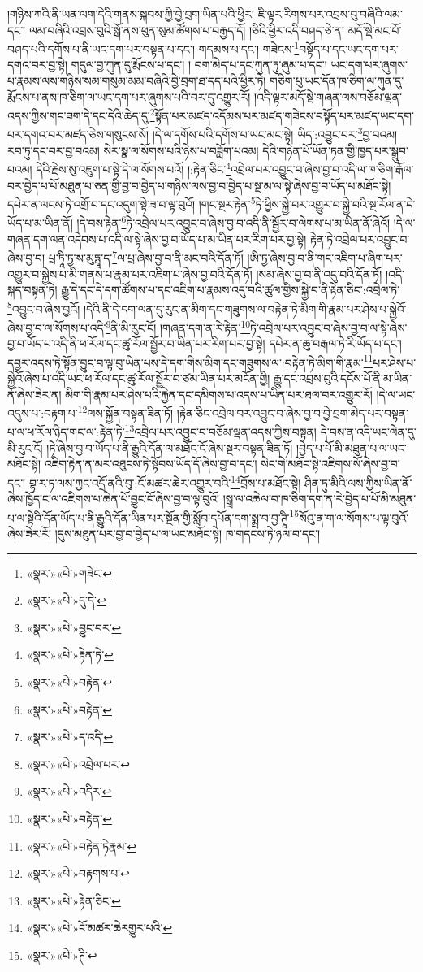 །གཉིས་ཀའི་ནི་ཡན་ལག་དེའི་གནས་སྐབས་ཀྱི་བྱེ་བྲག་ཡིན་པའི་ཕྱིར། ཇི་ལྟར་རིགས་པར་འབྲས་བུ་བཞིའི་ལམ་དང་། ལམ་བཞིའི་འབྲས་བུའི་སྒོ་ནས་ཕུན་སུམ་ཚོགས་པ་བརྒྱད་དོ། །ཅིའི་ཕྱིར་འདི་བཤད་ཅེ་ན། མདོ་སྡེ་མང་པོ་བཤད་པའི་དགོས་པ་ནི་ཡང་དག་པར་བསྟན་པ་དང་། གདམས་པ་དང་། གཟེངས་\footnote{«སྣར་»«པེ་»གཟེང་}བསྟོད་པ་དང་ཡང་དག་པར་དགའ་བར་བྱ་སྟེ། གདུལ་བྱ་ཀུན་དུ་རྨོངས་པ་དང་། །
བག་མེད་པ་དང་ཀུན་ཏུ་ཞུམ་པ་དང་། ཡང་དག་པར་ཞུགས་པ་རྣམས་ལས་གཉིས་སམ་གསུམ་མམ་བཞིའི་བྱེ་བྲག་ཐ་དད་པའི་ཕྱིར་ཏེ། གཅིག་པུ་ཡང་དོན་ཁ་ཅིག་ལ་ཀུན་དུ་རྨོངས་པ་ནས་ཁ་ཅིག་ལ་ཡང་དག་པར་ཞུགས་པའི་བར་དུ་འགྱུར་རོ། །འདི་ལྟར་མདོ་སྡེ་གཞན་ལས་བཅོམ་ལྡན་འདས་ཀྱིས་གང་ཟག་དེ་དང་དེའི་ཆེད་དུ་\footnote{«སྣར་»«པེ་»དུ་དེ་}སྟོན་པར་མཛད་འདོམས་པར་མཛད་གཟེངས་བསྟོད་པར་མཛད་ཡང་དག་པར་དགའ་བར་མཛད་ཅེས་གསུངས་སོ། །དེ་ལ་དགོས་པའི་དགོས་པ་ཡང་མང་སྟེ། ཡིད་:འབྱུང་བར་\footnote{«སྣར་»«པེ་»བྱུང་བར་}བྱ་བའམ། རབ་ཏུ་དང་བར་བྱ་བའམ། སེར་སྣ་ལ་སོགས་པའི་ཉེས་པ་བཟློག་པའམ། དེའི་གཉེན་པོ་ཡོན་ཏན་གྱི་ཁྱད་པར་སྒྲུབ་པའམ། དེའི་རྗེས་སུ་འཇུག་པ་སྟེ་དེ་ལ་སོགས་པའོ། །:རྟེན་ཅིང་\footnote{«སྣར་»«པེ་»རྟེན་ཏེ་}འབྲེལ་པར་འབྱུང་བ་ཞེས་བྱ་བ་འདི་ལ་ཁ་ཅིག་རྒོལ་བར་བྱེད་པ་པོ་མཐུན་པ་ཅན་གྱི་བྱ་བ་བྱེད་པ་གཉིས་ལས་བྱ་བ་བྱེད་པ་སྔ་མ་ལ་སྟེ་ཞེས་བྱ་བ་ཡོད་པ་མཐོང་སྟེ། དཔེར་ན་ལངས་ཏེ་འགྲོ་བ་དང་འདུག་སྟེ་ཟ་བ་ལྟ་བུའོ། །གང་སྔར་རྟེན་\footnote{«སྣར་»«པེ་»བརྟེན་}ཏེ་ཕྱིས་སྐྱེ་བར་འགྱུར་བ་སྐྱེ་བའི་སྔ་རོལ་ན་དེ་ཡོད་པ་མ་ཡིན་ནོ། །དེ་བས་རྟེན་\footnote{«སྣར་»«པེ་»བརྟེན་}ཏེ་འབྲེལ་པར་འབྱུང་བ་ཞེས་བྱ་བ་འདི་ནི་སྦྱོར་བ་ལེགས་པ་མ་ཡིན་ནོ་ཞེའོ། །དེ་ལ་གཞན་དག་ལན་འདེབས་པ་འདི་ལ་སྟེ་ཞེས་བྱ་བ་ཡོད་པ་མ་ཡིན་པར་རིག་པར་བྱ་སྟེ། རྟེན་ཏེ་འབྲེལ་པར་འབྱུང་བ་ཞེས་བྱ་བ། པྲ་ཏཱི་ཏྱ་ས་མུཏྤཱ་ད་\footnote{«སྣར་»«པེ་»ད་འདི་}ལ་པྲ་ཞེས་བྱ་བ་ནི་མང་བའི་དོན་ཏོ། །ཨི་ཏྱ་ཞེས་བྱ་བ་ནི་གང་འཇིག་པ་ཞིག་པར་འགྱུར་བ་སྐྱེས་པ་མི་གནས་པ་རྣམ་པར་འཇིག་པ་ཞེས་བྱ་བའི་དོན་ཏོ། །སམ་ཞེས་བྱ་བ་ནི་འདུ་བའི་དོན་ཏོ། །འདི་སྐད་བསྟན་ཏེ། རྒྱུ་དེ་དང་དེ་དག་ཚོགས་པ་དང་འཇིག་པ་རྣམས་འདུ་བའི་ཚུལ་གྱིས་སྐྱེ་བ་ནི་རྟེན་ཅིང་:འབྲེལ་ཏེ་\footnote{«སྣར་»«པེ་»འབྲེལ་པར་}འབྱུང་བ་ཞེས་བྱའོ། །དེའི་ནི་དེ་དག་ལན་དུ་རུང་ན་མིག་དང་གཟུགས་ལ་བརྟེན་ཏེ་མིག་གི་རྣམ་པར་ཤེས་པ་སྐྱེའོ་ཞེས་བྱ་བ་ལ་སོགས་པ་འདི་\footnote{«སྣར་»«པེ་»འདིར་}ནི་མི་རུང་ངོ། །གཞན་དག་ན་རེ་རྟེན་\footnote{«སྣར་»«པེ་»བརྟེན་}ཏེ་འབྲེལ་པར་འབྱུང་བ་ཞེས་བྱ་བ་ལ་སྟེ་ཞེས་བྱ་བ་ཡོད་པ་འདི་ནི་ཕ་རོལ་དང་ཚུ་རོལ་སྦྱོར་བ་ཡིན་པར་རིག་པར་བྱ་སྟེ། དཔེར་ན་ཆུ་བརྒལ་ཏེ་རི་ཡོད་པ་དང་། དབྱར་འདས་ཏེ་སྟོན་བྱུང་བ་ལྟ་བུ་ཡིན་པས་དེ་དག་གིས་མིག་དང་གཟུགས་ལ་:བརྟེན་ཏེ་མིག་གི་རྣམ་\footnote{«སྣར་»«པེ་»བརྟེན་ཏེརྣམ་}པར་ཤེས་པ་སྐྱེའོ་ཞེས་པ་འདི་ཡང་ཕ་རོལ་དང་ཚུ་རོལ་སྦྱོར་བ་ཙམ་ཡིན་པར་མངོན་གྱི། རྒྱུ་དང་འབྲས་བུའི་དངོས་པོ་ནི་མ་ཡིན་ནོ་ཞེས་ཟེར་ན། མིག་གི་རྣམ་པར་ཤེས་པའི་རྐྱེན་དང་དམིགས་པ་འདས་པ་ཡིན་པར་ཐལ་བར་འགྱུར་རོ། །དེ་ལ་ཡང་འདུས་པ་:བརྟག་པ་\footnote{«སྣར་»«པེ་»བརྟགས་པ་}ལས་སྐྱོན་བསྟན་ཟིན་ཏོ། །རྟེན་ཅིང་འབྲེལ་བར་འབྱུང་བ་ཞེས་བྱ་བ་བྱེ་བྲག་མེད་པར་བསྟན་པ་ལ་ཕ་རོལ་ཉིད་གང་ལ་:རྟེན་ཏེ་\footnote{«སྣར་»«པེ་»རྟེན་ཅིང་}འབྲེལ་པར་འབྱུང་བ་བཅོམ་ལྡན་འདས་ཀྱིས་བསྟན། དེ་བས་ན་འདི་ཡང་ལེན་དུ་མི་རུང་ངོ། །ཏེ་ཞེས་བྱ་བ་ཡོད་པ་ནི་རྒྱུའི་དོན་ལ་མཐོང་ངོ་ཞེས་སྔར་བསྟན་ཟིན་ཏོ། །བྱེད་པ་པོ་མི་མཐུན་པ་ལ་ཡང་མཐོང་སྟེ། འཇིག་རྟེན་ན་མར་འཐུངས་ཏེ་སྟོབས་ཡོད་དོ་ཞེས་བྱ་བ་དང་། སེང་གེ་མཐོང་སྟེ་འཇིགས་སོ་ཞེས་བྱ་བ་དང་། བྷ་ར་ཏ་ལས་ཀྱང་འདྲོ་ནའི་བུ་:ངོ་མཚར་ཆེར་འགྱུར་བའི་\footnote{«སྣར་»«པེ་»ངོ་མཚར་ཆེརགྱུར་པའི་}བྲོས་པ་མཐོང་སྟེ། ཤིན་ཏུ་མིའི་ལས་ཀྱིས་ཡིན་ནོ་ཞེས་ཁྱོད་ང་ལ་འཇིགས་པ་ཆེན་པོ་བྱུང་ངོ་ཞེས་བྱ་བ་ལྟ་བུའོ། །སྒྲ་ལ་འཆེལ་བ་ཁ་ཅིག་དག་ན་རེ་བྱེད་པ་པོ་མི་མཐུན་པ་ལ་སྟེའི་དོན་ཡོད་པ་ནི་རྒྱུའི་དོན་ཡིན་པར་སྔོན་གྱི་སློབ་དཔོན་དག་སྨྲ་བ་བྱ་ཊཱི་\footnote{«སྣར་»«པེ་»ཊི་}སོའུ་ན་ག་ལ་སོགས་པ་ལྟ་བུའོ་ཞེས་ཟེར་རོ། །དུས་མཐུན་པར་བྱ་བ་བྱེད་པ་ལ་ཡང་མཐོང་སྟེ། ཁ་གདངས་ཏེ་ཉལ་བ་དང་། 